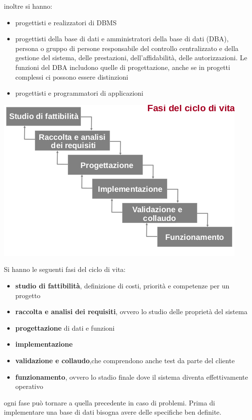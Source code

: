 \documentclass[a4paper,12pt, oneside]{book}
\begin{document}
inoltre si hanno:
\begin{itemize}
\item progettisti e realizzatori di DBMS
\item progettisti della base di dati e
amministratori della base di dati (DBA), persona o gruppo di persone responsabile del controllo centralizzato
e della gestione del sistema, delle
prestazioni, dell'affidabilità, delle
autorizzazioni. Le funzioni del DBA includono quelle di
progettazione, anche se in progetti
complessi ci possono essere distinzioni
\item progettisti e programmatori di applicazioni
\end{itemize}
\begin{center}
\includegraphics[scale=0.8]{img/bas.png}
\end{center}
Si hanno le seguenti fasi del ciclo di vita:
\begin{itemize}
\item \textbf{studio di fattibilità}, definizione di costi, priorità e competenze per un progetto
\item\textbf{raccolta e analisi dei requisiti}, ovvero lo studio delle proprietà del sistema
\item \textbf{progettazione} di dati e funzioni
\item \textbf{implementazione}
\item \textbf{validazione e collaudo},che comprendono anche test da parte del cliente
\item \textbf{funzionamento}, ovvero lo stadio finale dove il sistema diventa effettivamente operativo
\end{itemize}
ogni fase può tornare a quella precedente in caso di problemi. Prima di implementare una base di dati bisogna avere delle specifiche ben definite. \\
\end{document}

